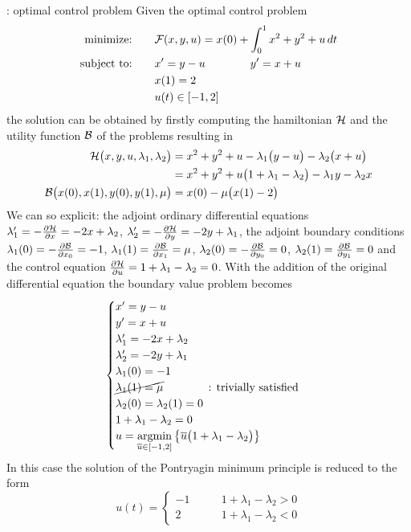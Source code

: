 \begin{example}{: optimal control problem}
	Given the optimal control problem
	\begin{align*}
		\textrm{minimize:} \qquad & \mathcal{F} (x,y,u) = x(0) + \int_0^1 x^2 + y^2 + u \, dt   \\
		\textrm{subject to:} \qquad & x' = y - u \qquad \qquad y' = x+u \\
		&x(1) = 2 \\ & u(t) \in [-1,2]
	\end{align*}
	the solution can be obtained by firstly computing the hamiltonian $\mathcal{H}$ and the utility function $\mathcal{B}$ of the problems resulting in
	\begin{align*}
		\mathcal{H}\big(x,y,u,\lambda_1,\lambda_2\big) & = x^2 + y^2 + u - \lambda_1 \big(y-u\big) - \lambda_2 \big(x + u\big) \\
		& = x^2 + y^2 + u \big(1 + \lambda_1 - \lambda_2\big) - \lambda_1 y - \lambda_2 x \\
		\mathcal{B}\big(x(0),x(1), y(0), y(1), \mu\big) & = x(0) - \mu \big( x(1) - 2\big)
	\end{align*}
	We can so explicit: the adjoint ordinary differential equations $\lambda_1' = -\frac{\partial \mathcal{H}}{\partial x} = - 2x + \lambda_2$, $\lambda_2' = -\frac{\partial \mathcal{H}}{\partial y} = -2y + \lambda_1$, the adjoint boundary conditions $\lambda_1(0) = - \frac{\partial \mathcal{B}}{\partial x_0} = - 1$, $\lambda_1(1) = \frac{\partial \mathcal{B}}{\partial x_1} = \mu $, $\lambda_2(0) = -\frac{\partial \mathcal{B}}{\partial y_0} = 0$, $\lambda_2(1) = \frac{\partial \mathcal{B}}{\partial y_1} = 0$ and the control equation $\frac{\partial \mathcal{H}}{\partial u} = 1 + \lambda_1 - \lambda_2 = 0$. With the addition of the original differential equation the boundary value problem becomes
	\[ \begin{cases}
		x' = y - u \\ y' = x+u \\
		\lambda_1' = -2x + \lambda_2 \\ \lambda_2' = -2y + \lambda_1 \\
		\lambda_1(0) = -1 \\ \cancel{\lambda_1(1) = \mu} \qquad \qquad \textrm{: trivially satisfied} \\
		\lambda_2(0) = \lambda_2(1) = 0 \\
		1 + \lambda_1 - \lambda_2 = 0 \\
		u = \underset{\overline u \in [-1,2]}{\textrm{argmin}} \left\{ \overline u \big(1 + \lambda_1 - \lambda_2\big)  \right\}
	\end{cases} \]
	In this case the solution of the Pontryagin minimum principle is reduced to the form
	\[ u(t) = \begin{cases}
		-1 \qquad & 1 + \lambda_1 - \lambda_2 > 0 \\
		2 & 1 + \lambda_1 - \lambda_2 < 0
	\end{cases} \]
	
\end{example}





















